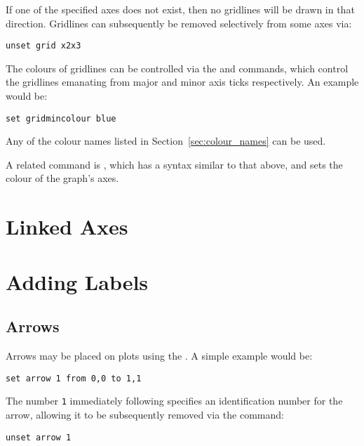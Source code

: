 If one of the specified axes does not exist, then no gridlines will be drawn in
that direction.  Gridlines can subsequently be removed selectively from some
axes via:

\begin{verbatim}
unset grid x2x3
\end{verbatim}

The colours of gridlines can be
controlled via the  and  commands, which control the gridlines emanating from major and
minor axis ticks respectively. An example would be:

\begin{verbatim}
set gridmincolour blue
\end{verbatim}

\noindent Any of the colour names listed in Section~\ref{sec:colour_names} can
be used.

A related command is , which has a syntax similar to that above, and sets the colour of
the graph's axes.\label{sec:set_colours}

\section{Linked Axes}

\section{Adding Labels}

\subsection{Arrows}

\label{sec:set_arrow} Arrows may be placed on plots using the
. A simple example would be:

\begin{verbatim}
set arrow 1 from 0,0 to 1,1
\end{verbatim}

\noindent The number {\tt 1} immediately following 
specifies an identification number for the arrow, allowing it to be
subsequently removed via the command:

\begin{verbatim}
unset arrow 1
\end{verbatim}

